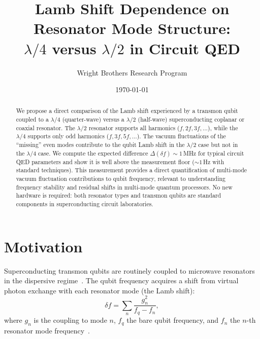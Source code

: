 \documentclass[aps,prl,twocolumn,superscriptaddress,nofootinbib]{revtex4-2}
\begin{document}
\title{Lamb Shift Dependence on Resonator Mode Structure:\\
$\lambda/4$ versus $\lambda/2$ in Circuit QED}

\author{Wright Brothers Research Program}

\date{\today}

\begin{abstract}
We propose a direct comparison of the Lamb shift experienced by
a transmon qubit coupled to a $\lambda/4$ (quarter-wave) versus
a $\lambda/2$ (half-wave) superconducting coplanar or coaxial
resonator.  The $\lambda/2$ resonator supports all harmonics
($f, 2f, 3f, \ldots$), while the $\lambda/4$ supports only odd
harmonics ($f, 3f, 5f, \ldots$).  The vacuum fluctuations of the
``missing'' even modes contribute to the qubit Lamb shift in the
$\lambda/2$ case but not in the $\lambda/4$ case.  We compute the
expected difference $\Delta(\delta f)\sim 1$\,MHz for typical
circuit QED parameters and show it is well above the measurement
floor ($\sim 1$\,Hz with standard techniques).  This measurement
provides a direct quantification of multi-mode vacuum fluctuation
contributions to qubit frequency, relevant to understanding
frequency stability and residual shifts in multi-mode quantum
processors.  No new hardware is required: both resonator types
and transmon qubits are standard components in superconducting
circuit laboratories.
\end{abstract}

\maketitle

\section{Motivation}

Superconducting transmon qubits are routinely coupled to
microwave resonators in the dispersive
regime~\cite{Blais2004,Koch2007}.  The qubit frequency acquires
a shift from virtual photon exchange with each resonator mode
(the Lamb shift):
\begin{equation}\label{eq:lamb}
  \delta f = \sum_n \frac{g_n^2}{f_q - f_n},
\end{equation}
where $g_n$ is the coupling to mode $n$, $f_q$ the bare qubit
frequency, and $f_n$ the $n$-th resonator mode
frequency~\cite{Schuster2007,Gambetta2006}.
\end{document}
